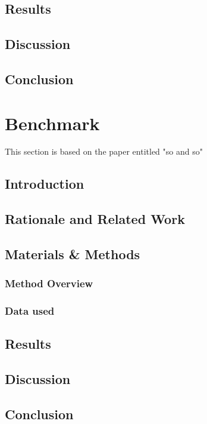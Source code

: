\subsection{Results}

\subsection{Discussion}

\subsection{Conclusion}



\section{Benchmark}\label{subsec:benchmark}
This section is based on the paper entitled "so and so"

\subsection{Introduction}

\subsection{Rationale and Related Work}

\subsection{Materials \& Methods}
\subsubsection{Method Overview}

\subsubsection{Data used}

\subsection{Results}

\subsection{Discussion}

\subsection{Conclusion}





